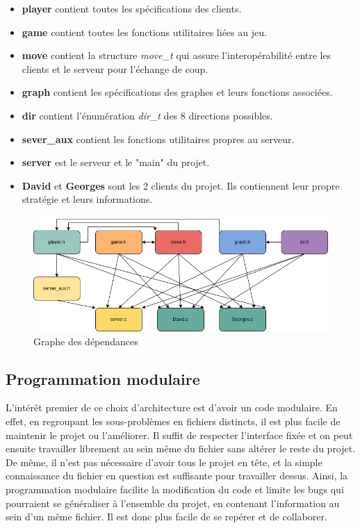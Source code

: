 \documentclass{article}
\begin{document}
\begin{itemize}
    \item \textbf{player} contient toutes les spécifications des clients.
    \item \textbf{game} contient toutes les fonctions utilitaires liées au jeu.
    \item \textbf{move} contient la structure \textit{move\_t} qui assure l'interopérabilité entre les clients et le serveur pour l'échange de coup.
    \item \textbf{graph} contient les spécifications des graphes et leurs fonctions associées.
    \item \textbf{dir} contient l'énumération \textit{dir\_t} des 8 directions possibles.
    \item \textbf{sever\_aux} contient les fonctions utilitaires propres au serveur.
    \item \textbf{server} est le serveur et le "main" du projet.
    \item \textbf{David} et \textbf{Georges} sont les 2 clients du projet. Ils contiennent leur propre stratégie et leurs informations.
\end{itemize}

\begin{figure}[!h]
    \centering
    \includegraphics[width=12cm]{diag_c.drawio.png}
    \caption{Graphe des dépendances}
    \label{fig:depend}
\end{figure}

\subsection{Programmation modulaire}
L’intérêt premier de ce choix d’architecture est d’avoir un code modulaire. En effet, en regroupant les sous-problèmes en fichiers distincts, il est plus facile de maintenir le projet ou l’améliorer. Il
suffit de respecter l’interface fixée et on peut ensuite travailler librement au sein même du fichier
sans altérer le reste du projet. De même, il n’est pas nécessaire d’avoir tous le projet en tête, et la
simple connaissance du fichier en question est suffisante pour travailler dessus.
Ainsi, la programmation modulaire facilite la modification du code et limite les bugs qui pourraient se généraliser à l’ensemble du projet, en contenant l’information au sein d’un même fichier. Il est
donc plus facile de se repérer et de collaborer.
\end{document}
